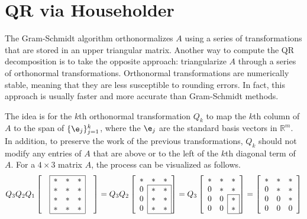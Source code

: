 \section*{QR via Householder} %

The Gram-Schmidt algorithm orthonormalizes $A$ using a series of transformations that are stored in an upper triangular matrix.
Another way to compute the QR decomposition is to take the opposite approach: triangularize $A$ through a series of orthonormal transformations.
Orthonormal transformations are numerically stable, meaning that they are less susceptible to rounding errors.
In fact, this approach is usually faster and more accurate than Gram-Schmidt methods.

The idea is for the $k$th orthonormal transformation $Q_k$ to map the $k$th column of $A$ to the span of $\{\e_j\}_{j=1}^k$, where the $\e_j$ are the standard basis vectors in $\mathbb{R}^m$.
In addition, to preserve the work of the previous transformations, $Q_k$ should not modify any entries of $A$ that are above or to the left of the $k$th diagonal term of $A$.
For a $4 \times 3$ matrix $A$, the process can be visualized as follows.
%
\begin{align*}
Q_3 Q_2 Q_1
\left[\begin{array}{ccccc}
\cline{2-4}
& \lvl{*} & * & \rvl{*} & \\
& \lvl{*} & * & \rvl{*}& \\
& \lvl{*} & * & \rvl{*} & \\
& \lvl{*} & * & \rvl{*} & \\ \cline{2-4}
\end{array}\right]
= Q_3 Q_2
\left[\begin{array}{ccc}
     *  & * &      * \\
\cline{2-3}
\rvl{0} & * & \rvl{*} \\
\rvl{0} & * & \rvl{*} \\
\rvl{0} & * & \rvl{*} \\
\cline{2-3}
\end{array}\right]
= Q_3
\left[\begin{array}{ccc}
* & * & * \\
0 & * & * \\
\cline{3-3}
0 & \rvl{0} & \rvl{*} \\
0 & \rvl{0} & \rvl{*} \\
\cline{3-3}
\end{array}\right]
=
\left[\begin{array}{ccc}
* & * & * \\
0 & * & * \\
0 & 0 & * \\
0 & 0 & 0 \\
\end{array}\right]
\end{align*}

